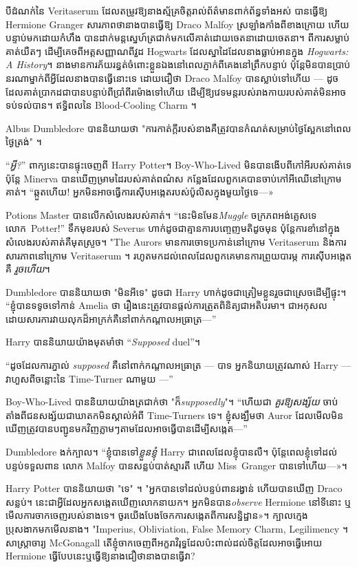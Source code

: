 {បីដំណក់នៃ Veritaserum ដែលតម្រូវឱ្យនាងស្ម័គ្រចិត្តរាល់ព័ត៌មានពាក់ព័ន្ធទាំងអស់ បានធ្វើឱ្យ Hermione Granger សារភាពថានាងបានធ្វើឱ្យ Draco Malfoy ស្រឡាំងកាំងពីខាងក្រោយ ហើយបន្ទាប់មកដោយកំហឹង បានដាក់មន្តស្នេហ៍ត្រជាក់មកលើគាត់ដោយចេតនាដោយចេតនា។ ពីការសម្លាប់គាត់យឺតៗ ដើម្បីគេចពីអត្តសញ្ញាណពីវួដ Hogwarts ដែលស្នាដៃដែលនាងធ្លាប់អានក្នុង \emph{Hogwarts: A History}។ នាងមានការភ័យរន្ធត់ចំពោះខ្លួនឯងនៅពេលភ្ញាក់ពីគេងនៅព្រឹកបន្ទាប់ ប៉ុន្តែមិនបានប្រាប់នរណាម្នាក់ពីអ្វីដែលនាងបានធ្វើនោះទេ ដោយជឿថា Draco Malfoy បានស្លាប់ទៅហើយ — ដូចដែលគាត់ប្រាកដជាបានបន្ទាប់ពីប្រាំពីរម៉ោងទៅហើយ ដើម្បីឱ្យវេទមន្តរបស់រាងកាយរបស់គាត់មិនអាចទប់ទល់បាន។ ឥទ្ធិពលនៃ Blood-Cooling Charm ។

Albus Dumbledore បាននិយាយថា "ការកាត់ក្តីរបស់នាងគឺត្រូវបានកំណត់សម្រាប់ថ្ងៃស្អែកនៅពេលថ្ងៃត្រង់" ។

“\emph{អ្វី?}” ពាក្យនេះបានផ្ទុះចេញពី Harry Potter។ Boy-Who-Lived មិនបានងើបពីកៅអីរបស់គាត់ទេ ប៉ុន្តែ Minerva បានឃើញម្រាមដៃរបស់គាត់ពណ៌ស កន្លែងដែលពួកគេបានចាប់កៅអីឈើនៅក្រោមគាត់។ “ឆ្កួត​ហើយ! អ្នក​មិន​អាច​ធ្វើ​ការ​ស៊ើប​អង្កេត​របស់​ប៉ូលិស​ក្នុង​មួយ​ថ្ងៃ​ទេ—»

Potions Master បានលើកសំលេងរបស់គាត់។ “នេះមិនមែន\emph{Muggle} ចក្រភពអង់គ្លេសទេ លោក~Potter!” ទឹកមុខរបស់ Severus ហាក់ដូចជាគ្មានការបញ្ចេញមតិដូចមុន ប៉ុន្តែការខាំនៅក្នុងសំលេងរបស់គាត់គឺមុតស្រួច។ "The Aurors មានការចោទប្រកាន់នៅក្រោម Veritaserum និងការសារភាពនៅក្រោម Veritaserum ។ រហូត​មក​ដល់​ពេល​ដែល​ពួក​គេ​មាន​ការ​ព្រួយ​បារម្ភ ការ​ស៊ើប​អង្កេត​គឺ \emph{រួច​ហើយ}។

Dumbledore បាននិយាយថា "មិនអីទេ" ដូចជា Harry ហាក់ដូចជាត្រៀមខ្លួនរួចជាស្រេចដើម្បីផ្ទុះ។ “ខ្ញុំបានទទូចទៅកាន់ Amelia ថា រឿងនេះត្រូវបានផ្តល់ការត្រួតពិនិត្យជាអតិបរមា។ ជាអកុសល ដោយសារការវាយលុកដ៏អាក្រក់គឺនៅពាក់កណ្តាលអធ្រាត្រ—”

Harry បាននិយាយយ៉ាងមុតមាំថា “\emph{Supposed} duel”។

“ដូចដែលការភ្នាល់ \emph{supposed} គឺនៅពាក់កណ្តាលអធ្រាត្រ — បាទ អ្នកនិយាយត្រូវណាស់ Harry — វាហួសពីចន្លោះនៃ Time-Turner ណាមួយ —”

Boy-Who-Lived បាននិយាយយ៉ាងត្រជាក់ថា "ក៏\emph{supposedly}"។ “ហើយជា \emph{គួរឱ្យសង្ស័យ} ចាប់តាំងពីជនសង្ស័យជាឃាតកមិនស្គាល់អំពី Time-Turners ទេ។ ខ្ញុំសង្ឃឹមថា Auror ដែលមើលមិនឃើញត្រូវបានបញ្ជូនមកវិញភ្លាមៗតាមដែលអាចធ្វើបានដើម្បីសង្កេត—”

Dumbledore ងក់ក្បាល។ “ខ្ញុំបានទៅ\emph{ខ្លួនខ្ញុំ} Harry ជាពេលដែលខ្ញុំបានលឺ។ ប៉ុន្តែ​ពេល​ខ្ញុំ​ទៅ​ដល់​បន្ទប់​ទទួល​ពាន លោក Malfoy បាន​សន្លប់​បាត់​ស្មារតី ហើយ Miss~Granger បាន​ទៅ​ហើយ—»។

Harry Potter បាននិយាយថា "ទេ" ។ "អ្នកបានទៅដល់បន្ទប់ពានរង្វាន់ ហើយបានឃើញ Draco សន្លប់។ នេះ​ជា​អ្វី​ដែល​អ្នក​សង្កេត​ឃើញ​លោក​នាយក​។ អ្នកមិនបាន\emph{observe} Hermione នៅទីនោះ ឬមើលការចាកចេញរបស់នាងទេ។ ចូរ​យើង​បែងចែក​ការ​សង្កេត​ពី​ការ​សន្និដ្ឋាន»។ ក្បាលក្មេងប្រុសងាកមកមើលនាង។ "Imperius, Obliviation, False Memory Charm, Legilimency ។ សាស្រ្តាចារ្យ McGonagall តើខ្ញុំចាកចេញពីអក្ខរាវិរុទ្ធដែលប៉ះពាល់ដល់ចិត្តដែលអាចធ្វើអោយ Hermione ធ្វើបែបនេះឬធ្វើឱ្យនាងជឿថានាងបានធ្វើវា?

}
